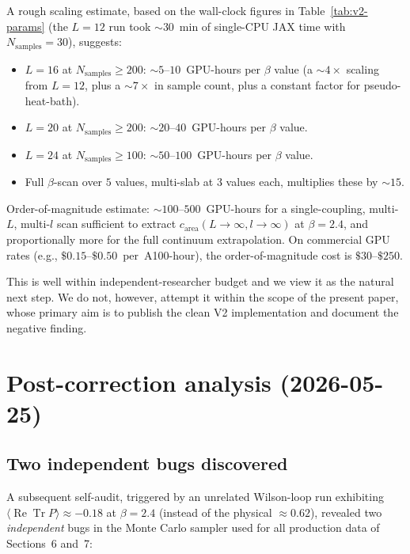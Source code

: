 \documentclass[11pt,a4paper]{article}
\theoremstyle{definition}
\newcommand{\Tr}{\operatorname{Tr}}
\renewcommand{\Re}{\operatorname{Re}}
\begin{document}
A rough scaling estimate, based on the wall-clock figures in
Table~\ref{tab:v2-params} (the $L = 12$ run took $\sim 30$~min of
single-CPU JAX time with $N_{\mathrm{samples}} = 30$), suggests:
\begin{itemize}
   \item $L = 16$ at $N_{\mathrm{samples}} \ge 200$:
         $\sim 5$--$10$~GPU-hours per $\beta$ value
         (a $\sim 4\times$ scaling from $L = 12$, plus a $\sim
         7\times$ in sample count, plus a constant factor for
         pseudo-heat-bath).
   \item $L = 20$ at $N_{\mathrm{samples}} \ge 200$:
         $\sim 20$--$40$~GPU-hours per $\beta$ value.
   \item $L = 24$ at $N_{\mathrm{samples}} \ge 100$:
         $\sim 50$--$100$~GPU-hours per $\beta$ value.
   \item Full $\beta$-scan over $5$ values, multi-slab at $3$ values
         each, multiplies these by $\sim 15$.
\end{itemize}
Order-of-magnitude estimate: $\sim 100$--$500$~GPU-hours for a
single-coupling, multi-$L$, multi-$l$ scan sufficient to extract
$c_{\mathrm{area}}(L \to \infty, l \to \infty)$ at $\beta = 2.4$, and
proportionally more for the full continuum extrapolation. On
commercial GPU rates (e.g., $\$0.15$--$\$0.50$~per~A100-hour), the
order-of-magnitude cost is $\$30$--$\$250$.

This is well within independent-researcher budget and we view it as
the natural next step. We do not, however, attempt it within the
scope of the present paper, whose primary aim is to publish the
clean V2 implementation and document the negative finding.

\section{Post-correction analysis (2026-05-25)}
\label{sec:post-correction}

\subsection{Two independent bugs discovered}

A subsequent self-audit, triggered by an unrelated Wilson-loop run
exhibiting $\langle\Re\Tr P\rangle \approx -0.18$ at $\beta = 2.4$
(instead of the physical $\approx 0.62$), revealed two
\emph{independent} bugs in the Monte Carlo sampler used for all
production data of Sections~6 and~7:
\end{document}
